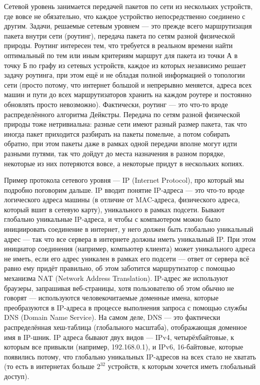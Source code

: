 \documentclass[a5paper]{article}
\begin{document}
Сетевой уровень занимается передачей пакетов по сети из нескольких устройств, где вовсе не обязательно, что каждое устройство непосредственно соединено с другим. Задачи, решаемые сетевым уровнем --- это прежде всего маршрутизация пакета внутри сети (роутинг), передача пакета по сетям разной физической природы. Роутинг интересен тем, что требуется в реальном времени найти оптимальный по тем или иным критериям маршрут для пакета из точки А в точку Б по графу из сетевых устройств, каждое из которых независимо решает задачу роутинга, при этом ещё и не обладая полной информацией о топологии сети (просто потому, что интернет большой и непрерывно меняется, адреса всех машин и пути до всех маршрутизаторов хранить на каждом роутере и постоянно обновлять просто невозможно). Фактически, роутинг --- это что-то вроде распределённого алгоритма Дейкстры. Передача по сетям разной физической природы тоже нетривиальна: разные сети имеют разный размер пакета, так что иногда пакет приходится разбирать на пакеты помельче, а потом собирать обратно, при этом пакеты даже в рамках одной передачи вполне могут идти разными путями, так что дойдут до места назначения в разном порядке, некоторые из них потеряются вовсе, а некоторые придут в нескольких копиях.

Пример протокола сетевого уровня --- IP (Internet Protocol), про который мы подробно поговорим дальше. IP вводит понятие IP-адреса --- это что-то вроде логического адреса машины (в отличие от MAC-адреса, физического адреса, который вшит в сетевую карту), уникального в рамках подсети. Бывают глобально уникальные IP-адреса, и чтобы с компьютером можно было инициировать соединение в интернет, у него должен быть глобально уникальный адрес --- так что все сервера в интернете должны иметь уникальный IP. При этом инициатор соединения (например, компьютер клиента) может уникального адреса не иметь, если его адрес уникален в рамках его подсети --- ответ от сервера всё равно ему придёт правильно, об этом заботится маршрутизатор с помощью механизма NAT (Network Address Translation). IP-адрес же используют браузеры, запрашивая веб-страницы, хотя пользователю об этом обычно не говорят --- используются человекочитаемые доменные имена, которые преобразуются в IP-адреса в процессе выполнения запроса с помощью службы DNS (Domain Name Service). На самом деле, DNS --- это фактически распределённая хеш-таблица (глобального масштаба), отображающая доменное имя в IP-шник. IP адреса бывают двух видов --- IPv4, четырёхбайтовые, к которым все привыкли (например, 192.168.0.1), и IPv6, 16-байтовые, которые появились потому, что глобально уникальных IP-адресов на всех стало не хватать (то есть в интернетах больше $2^{32}$ устройств, к которым хочется иметь глобальный доступ).
\end{document}
